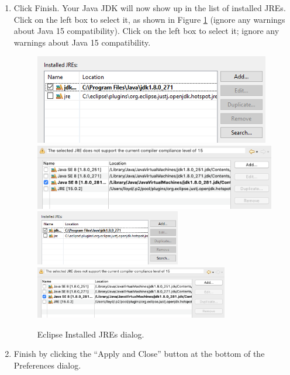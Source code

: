 \begin{enumerate}
\item Click {\sf Finish}. Your Java JDK will now show up in the list
of installed JREs.
\ifWindows %
Click on the left box to select it, as shown in
Figure \ref{InstalledJREs:fig} (ignore any warnings about Java 15
compatibility).
\fi %
\fi %
\ifLinux %
Click on the left box to select it; ignore any warnings about Java
15 compatibility.
\else %
\begin{figure}[ht]
\begin{center}
\iflatexml
  \ifWindows
     \includegraphics[]{images/EclipseInstalledJREs}
  \else
     \includegraphics[]{images/EclipseInstalledJREsMacOS}
  \fi
\else
  \ifWindows
     \includegraphics[width=0.6\textwidth]{images/EclipseInstalledJREs}
  \else
     \includegraphics[width=0.8\textwidth]{images/EclipseInstalledJREsMacOS}
  \fi
\fi
\end{center}
\caption{Eclipse Installed JREs dialog.}
\label{InstalledJREs:fig}
\end{figure}
\fi %

\item Finish by clicking the ``{\sf Apply and Close}'' button at the
bottom of the {\sf Preferences} dialog.

\end{enumerate}

